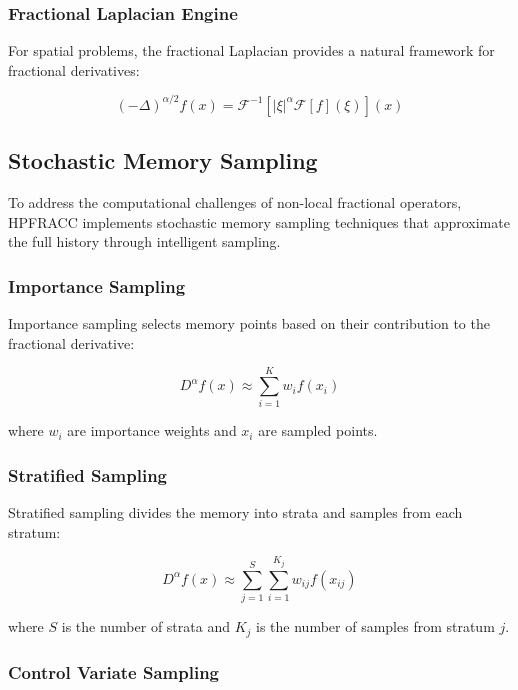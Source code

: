 \documentclass[12pt]{article}
\begin{document}
\subsubsection{Fractional Laplacian Engine}

For spatial problems, the fractional Laplacian provides a natural framework for fractional derivatives:

\begin{equation}
(-\Delta)^{\alpha/2}f(x) = \mathcal{F}^{-1}[|\xi|^{\alpha} \mathcal{F}[f](\xi)](x)
\end{equation}

\subsection{Stochastic Memory Sampling}

To address the computational challenges of non-local fractional operators, HPFRACC implements stochastic memory sampling techniques that approximate the full history through intelligent sampling.

\subsubsection{Importance Sampling}

Importance sampling selects memory points based on their contribution to the fractional derivative:

\begin{equation}
D^{\alpha}f(x) \approx \sum_{i=1}^{K} w_i f(x_i)
\end{equation}

where $w_i$ are importance weights and $x_i$ are sampled points.

\subsubsection{Stratified Sampling}

Stratified sampling divides the memory into strata and samples from each stratum:

\begin{equation}
D^{\alpha}f(x) \approx \sum_{j=1}^{S} \sum_{i=1}^{K_j} w_{ij} f(x_{ij})
\end{equation}

where $S$ is the number of strata and $K_j$ is the number of samples from stratum $j$.

\subsubsection{Control Variate Sampling}
\end{document}
